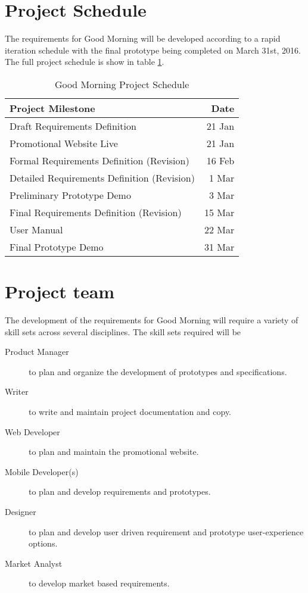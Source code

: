 \documentclass[11pt]{article}
\begin{document}
\section{Project Schedule}\label{project-schedule}

The requirements for Good Morning will be developed according to a rapid iteration schedule with the final prototype being completed on March 31st, 2016. The full project schedule is show in table \ref{tab:schedule}.

\begin{table}[htb]
    \caption{Good Morning Project Schedule}\label{tab:schedule}
    \centering
    \begin{tabular}{|lr|}
        \hline
        \textbf{Project Milestone} & \textbf{Date} \\
        \hline
        Draft Requirements Definition & 21 Jan \\
        Promotional Website Live & 21 Jan \\
        Formal Requirements Definition (Revision) & 16 Feb \\
        Detailed Requirements Definition (Revision) & 1 Mar \\
        Preliminary Prototype Demo & 3 Mar \\
        Final Requirements Definition (Revision) & 15 Mar \\
        User Manual & 22 Mar \\
        Final Prototype Demo & 31 Mar \\
        \hline
    \end{tabular}
\end{table}



%
\section{Project team}\label{project-team}

The development of the requirements for Good Morning will require a variety of skill sets across several disciplines. The skill sets required will be

\begin{description}
  \item[Product Manager] to plan and organize the development of prototypes and specifications.
  \item[Writer] to write and maintain project documentation and copy.
  \item[Web Developer] to plan and maintain the promotional website.
  \item[Mobile Developer(s)] to plan and develop requirements and prototypes.
  \item[Designer] to plan and develop user driven requirement and prototype user-experience options.
  \item[Market Analyst] to develop market based requirements.
\end{description}
\end{document}
